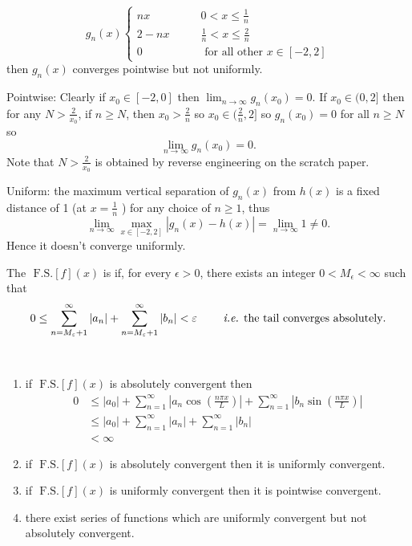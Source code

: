 \documentclass[class=article,crop=false]{standalone}
\begin{document}
\begin{eg}[]
\begin{equation*}
	g_n(x)
\begin{cases}
	nx \qquad & 0<x\leq \frac{1}{n}\\
	2-nx \qquad & \frac{1}{n} < x \leq \frac{2}{n}\\
	0 \qquad & \text{ for all other } x \in [-2,2] 
\end{cases}
\end{equation*}
then $ g_n(x)$ converges pointwise but not uniformly.

Pointwise: Clearly if $ x_0 \in [-2,0]$ then $\lim_{ n \to \infty} g_n(x_0)=0$. If $ x_0 \in (0,2]$ then for any $ N > \frac{2}{x_0}$, if $ n \geq N$, then  $ x_0 > \frac{2}{n}$ so $ x_0 \in (\frac{2}{n},2]$ so $ g_n(x_0) =0$ for all $ n\geq N$ so
 \[
	 \lim_{ n \to \infty} g_n(x_0) = 0 
.\] 
Note that $ N> \frac{2}{x_0}$ is obtained by reverse engineering on the scratch paper.

Uniform: the maximum vertical separation of $ g_n(x)$ from $ h(x)$ is a fixed distance of 1 (at $ x=\frac{1}{n}$ ) for any choice of  $ n \geq 1$, thus
 \[
	 \lim_{ n \to \infty} \max_{x \in [-2,2]} |g_n(x) - h(x)| = \lim_{ n \to \infty}  1 \neq 0
.\] 
Hence it doesn't converge uniformly. 

\begin{defn}
	\item The $ \text{ F.S.} [ f]( x) $ is  if, for every $ \epsilon>0$, there exists an integer $ 0< M_{ \epsilon}< \infty$ such that
		\[
		0\leq \sum_{ n=M_{ \epsilon}+1}^{\infty} |a_n| + \sum_{ n=M_{ \epsilon}+1}^{\infty} |b_n| < \epsilon \qquad \text{ \emph{i.e.} the tail converges absolutely} 
		.\] 
\begin{note}[]
~\begin{enumerate}[label=\arabic*)]
	\item if $ \text{ F.S.} [ f]( x) $ is absolutely convergent then
	\begin{align*}
		0 &\leq |a_0| + \sum_{ n= 1}^{\infty} \left| a_n \cos \left( \frac{ n\pi x}{ L} \right)  \right| + \sum_{ n= 1}^{\infty} \left| b_n \sin \left( \frac{ n\pi x}{ L} \right)  \right| \\
		  &\leq |a_0| + \sum_{ n= 1}^{\infty} |a_n| + \sum_{ n= 1}^{\infty} |b_n|\\
		  &< \infty
	\end{align*}
	\item if $ \text{ F.S.} [ f]( x) $ is absolutely convergent then it is uniformly convergent.
	\item if $ \text{ F.S.} [ f]( x) $ is uniformly convergent then it is pointwise convergent.
	\item there exist series of functions which are uniformly convergent but not absolutely convergent.
\end{enumerate}
\end{note}
\end{defn}


\end{eg}
\end{document}
